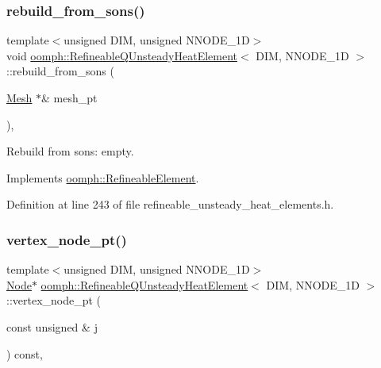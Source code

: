 \subsubsection{\texorpdfstring{rebuild\+\_\+from\+\_\+sons()}{rebuild\_from\_sons()}}
{\footnotesize\ttfamily template$<$unsigned D\+IM, unsigned N\+N\+O\+D\+E\+\_\+1D$>$ \\
void \hyperlink{classoomph_1_1RefineableQUnsteadyHeatElement}{oomph\+::\+Refineable\+Q\+Unsteady\+Heat\+Element}$<$ D\+IM, N\+N\+O\+D\+E\+\_\+1D $>$\+::rebuild\+\_\+from\+\_\+sons (\begin{DoxyParamCaption}\item[{\hyperlink{classoomph_1_1Mesh}{Mesh} $\ast$\&}]{mesh\+\_\+pt }\end{DoxyParamCaption})\hspace{0.3cm}{\ttfamily [inline]}, {\ttfamily [virtual]}}



Rebuild from sons\+: empty. 



Implements \hyperlink{classoomph_1_1RefineableElement_a33324be27833fa4b78279d17158215fa}{oomph\+::\+Refineable\+Element}.



Definition at line 243 of file refineable\+\_\+unsteady\+\_\+heat\+\_\+elements.\+h.

\mbox{\label{classoomph_1_1RefineableQUnsteadyHeatElement_a1d82313d60a69d06bf02e807e4718a7a}} 
\subsubsection{\texorpdfstring{vertex\+\_\+node\+\_\+pt()}{vertex\_node\_pt()}}
{\footnotesize\ttfamily template$<$unsigned D\+IM, unsigned N\+N\+O\+D\+E\+\_\+1D$>$ \\
\hyperlink{classoomph_1_1Node}{Node}$\ast$ \hyperlink{classoomph_1_1RefineableQUnsteadyHeatElement}{oomph\+::\+Refineable\+Q\+Unsteady\+Heat\+Element}$<$ D\+IM, N\+N\+O\+D\+E\+\_\+1D $>$\+::vertex\+\_\+node\+\_\+pt (\begin{DoxyParamCaption}\item[{const unsigned \&}]{j }\end{DoxyParamCaption}) const\hspace{0.3cm}{\ttfamily [inline]}, {\ttfamily [virtual]}}



